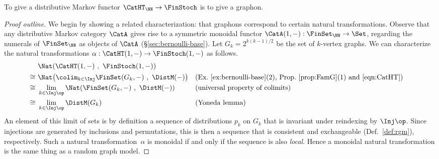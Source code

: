 \begin{theorem}\label{thm:Markov-functor-graphon}
  To give a distributive Markov functor $\CatHT_\NN \to \FinStoch$ is to give a graphon.
\end{theorem}
\begin{proof}[Proof outline]
  We begin by showing a related characterization: that graphons correspond to certain natural transformations. 
  Observe that any distributive Markov category $\CatA$
  gives rise to a symmetric monoidal functor $\CatA(1,-):\FinSet_\NN\to\Set$, regarding the numerals of $\FinSet_\NN$ as objects of $\CatA$ (\S\ref{sec:bernoulli-base}). 
  Let $G_k=2^{k(k-1)/2}$ be the set of $k$-vertex graphs. 
  We can characterize the natural transformations $\alpha :
  \CatHT(1,-) \to \FinStoch(1,-)$ as follows.
  \begin{align*}
    &     \Nat(\CatHT(1,-)\ ,\ \FinStoch(1,-))\\
    \cong\ &\Nat\big(\colim_{k\in\Inj}\FinSet(G_k,-)\ ,\ \DistM(-)\big)
    &&\text{(Ex.~\ref{ex:bernoulli-base}(2), Prop.~\ref{prop:FamG}(1) and \eqref{eqn:CatHT})}\\
    \cong\ &\lim_{k\in \Inj\op}\Nat(\FinSet(G_k,-)\ ,\ \DistM(-))&&\text{(universal property of colimits)}\\
    \cong\ &\lim_{k\in \Inj\op}\DistM(G_k)&&\text{(Yoneda lemma)}
  \end{align*}
  An element of this limit of sets is by definition a sequence of distributions $p_k$ on $G_k$ that is invariant under reindexing by $\Inj\op$. Since injections are generated by inclusions and permutations, this is then a sequence that is consistent and exchangeable (Def.~\ref{def:rgm}), respectively.
  Such a natural transformation~$\alpha$ is monoidal if and only if
  the sequence is also \emph{local}. Hence a monoidal natural transformation is the
  same thing as a random graph model.


\end{proof}
